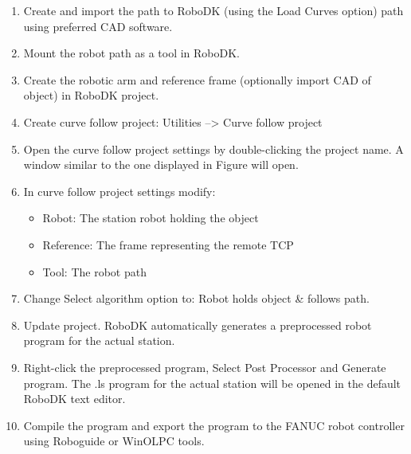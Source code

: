 \begin{enumerate}

\item Create and import the path to RoboDK  (using the Load Curves option) path using preferred CAD software. 

\item Mount the robot path as a tool in RoboDK.

\item Create the robotic arm and reference frame (optionally import CAD of object) in RoboDK project. 

\item Create curve follow project: Utilities --> Curve follow project

\item Open the curve follow project settings by double-clicking the project name. A window similar to the one displayed in Figure will open. 

\item In curve follow project settings modify:

    \begin{itemize}

        \item Robot: The station robot holding the object
        \item Reference: The frame representing the remote TCP
        \item Tool: The robot path
        
    \end{itemize}
    
\item Change Select algorithm option to: Robot holds object & follows path.

\item Update project. RoboDK automatically generates a preprocessed robot program for the actual station.

\item Right-click the preprocessed program, Select Post Processor and Generate program. The .ls program for the actual station will be opened in the default RoboDK text editor.

\item Compile the program and export the program to the FANUC robot controller using Roboguide or WinOLPC tools.
    
\end{enumerate}


